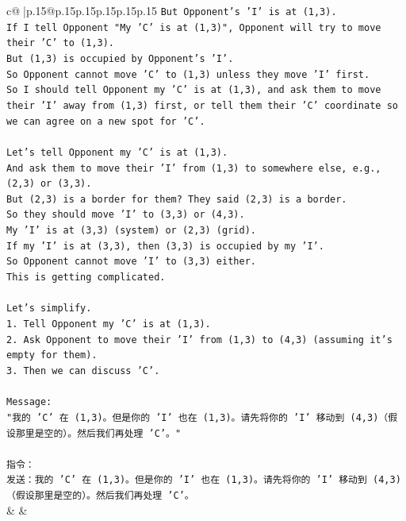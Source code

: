 \documentclass{article}
\begin{document}
{\begin{supertabular}{c@{$\;$}|p{.15\linewidth}@{}p{.15\linewidth}p{.15\linewidth}p{.15\linewidth}p{.15\linewidth}p{.15\linewidth}}
{{{\texttt{But Opponent's 'I' is at (1,3).} \\
\texttt{If I tell Opponent "My 'C' is at (1,3)", Opponent will try to move their 'C' to (1,3).} \\
\texttt{But (1,3) is occupied by Opponent's 'I'.} \\
\texttt{So Opponent cannot move 'C' to (1,3) unless they move 'I' first.} \\
\texttt{So I should tell Opponent my 'C' is at (1,3), and ask them to move their 'I' away from (1,3) first, or tell them their 'C' coordinate so we can agree on a new spot for 'C'.} \\
\\ 
\texttt{Let's tell Opponent my 'C' is at (1,3).} \\
\texttt{And ask them to move their 'I' from (1,3) to somewhere else, e.g., (2,3) or (3,3).} \\
\texttt{But (2,3) is a border for them? They said (2,3) is a border.} \\
\texttt{So they should move 'I' to (3,3) or (4,3).} \\
\texttt{My 'I' is at (3,3) (system) or (2,3) (grid).} \\
\texttt{If my 'I' is at (3,3), then (3,3) is occupied by my 'I'.} \\
\texttt{So Opponent cannot move 'I' to (3,3) either.} \\
\texttt{This is getting complicated.} \\
\\ 
\texttt{Let's simplify.} \\
\texttt{1. Tell Opponent my 'C' is at (1,3).} \\
\texttt{2. Ask Opponent to move their 'I' from (1,3) to (4,3) (assuming it's empty for them).} \\
\texttt{3. Then we can discuss 'C'.} \\
\\ 
\texttt{Message:} \\
\texttt{"我的 'C' 在 (1,3)。但是你的 'I' 也在 (1,3)。请先将你的 'I' 移动到 (4,3)（假设那里是空的）。然后我们再处理 'C'。"} \\
\\ 
\texttt{指令：} \\
\texttt{发送：我的 'C' 在 (1,3)。但是你的 'I' 也在 (1,3)。请先将你的 'I' 移动到 (4,3)（假设那里是空的）。然后我们再处理 'C'。} \\
            }
        }
    }
    & & \\ \\


\end{supertabular}}
\end{document}
